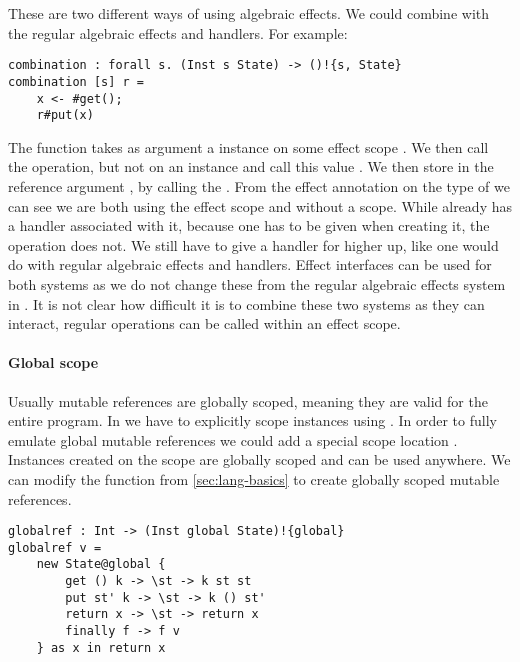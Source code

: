 These are two different ways of using algebraic effects.
We could combine \lang{} with the regular algebraic effects and handlers.
For example:
\begin{verbatim}
combination : forall s. (Inst s State) -> ()!{s, State}
combination [s] r =
	x <- #get();
	r#put(x)
\end{verbatim}

The function  takes as argument a  instance on some effect scope .
We then call the  operation, but not on an instance and call this value .
We then store  in the reference argument , by calling the .
From the effect annotation on the type of  we can see we are both using the effect scope  and  without a scope.
While  already has a handler associated with it, because one has to be given when creating it, the  operation does not.
We still have to give a handler for  higher up, like one would do with regular algebraic effects and handlers.
Effect interfaces can be used for both systems as we do not change these from the regular algebraic effects system in \lang{}.
It is not clear how difficult it is to combine these two systems as they can interact, regular operations can be called within an effect scope.

\paragraph{Global scope} \label{sec:globalscopes}
Usually mutable references are globally scoped, meaning they are valid for the entire program.
In \lang{} we have to explicitly scope instances using .
In order to fully emulate global mutable references we could add a special scope location .
Instances created on the  scope are globally scoped and can be used anywhere.
We can modify the  function from \cref{sec:lang-basics} to create globally scoped mutable references.
\begin{verbatim}
globalref : Int -> (Inst global State)!{global}
globalref v =
	new State@global {
		get () k -> \st -> k st st
		put st' k -> \st -> k () st'
		return x -> \st -> return x
		finally f -> f v
	} as x in return x
\end{verbatim}

